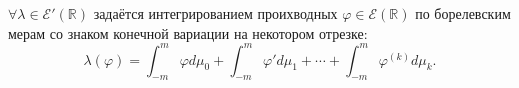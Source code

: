 \begin{to_thr}
	$\forall \lambda \in \mathcal{E}'(\mathbb{R})$ задаётся интегрированием проихводных $\varphi\in \mathcal{E}(\mathbb{R})$ по борелевским мерам со знаком конечной вариации на некотором отрезке:
	\begin{equation*}
		\lambda(\varphi) = \int_{-m}^{m} \varphi d \mu_0 + \int_{-m}^{m} \varphi' d \mu_1 + \cdots + \int_{-m}^{m}\varphi^{(k)} d \mu_k.
	\end{equation*}
\end{to_thr}